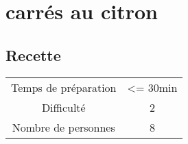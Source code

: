 \newpage
\section{carrés au citron}
    \label{sec:carrés au citron}
    \subsection{Recette}
    \vspace{1cm}


    \begin{center}
        \begin{tabular}{c|c}
            Temps de préparation & <= 30min \\
            Difficulté & 2 \\
            Nombre de personnes & 8 
        \end{tabular}
    \end{center}{}

    \vspace{1cm}
    \hline
    \vspace{1cm}

